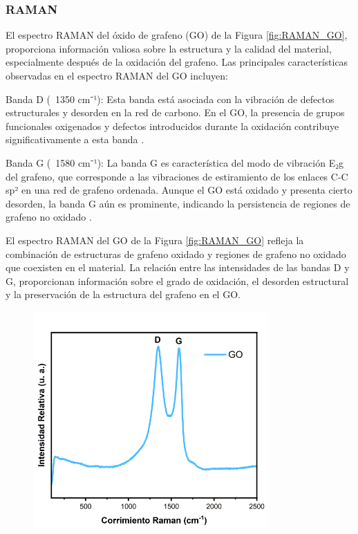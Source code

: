 \documentclass[12pt]{article}
\begin{document}
\subsubsection{RAMAN}
El espectro RAMAN del óxido de grafeno (GO) de la Figura \ref{fig:RAMAN_GO}, proporciona información valiosa sobre la estructura y la calidad del material, especialmente después de la oxidación del grafeno. Las principales características observadas en el espectro RAMAN del GO incluyen:\vspace{1em} %

Banda D (~1350 cm⁻¹): Esta banda está asociada con la vibración de defectos estructurales y desorden en la red de carbono. En el GO, la presencia de grupos funcionales oxigenados y defectos introducidos durante la oxidación contribuye significativamente a esta banda \cite{IEEEreferencias:GO_GOr}.\vspace{1em} %

Banda G (~1580 cm⁻¹): La banda G es característica del modo de vibración E₂g del grafeno, que corresponde a las vibraciones de estiramiento de los enlaces C-C sp² en una red de grafeno ordenada. Aunque el GO está oxidado y presenta cierto desorden, la banda G aún es prominente, indicando la persistencia de regiones de grafeno no oxidado \cite{IEEEreferencias:GORAMAN}.\vspace{1em} %

El espectro RAMAN del GO de la Figura \ref{fig:RAMAN_GO} refleja la combinación de estructuras de grafeno oxidado y regiones de grafeno no oxidado que coexisten en el material. La relación entre las intensidades de las bandas D y G, proporcionan información sobre el grado de oxidación, el desorden estructural y la preservación de la estructura del grafeno en el GO.
\begin{figure}[H]
    	   \begin{center}
     	  	\includegraphics[width = 0.8\textwidth]{Imagenes/GO_RAMAN.png}
    	   \end{center} 
        \end{figure}
        
\end{document}
